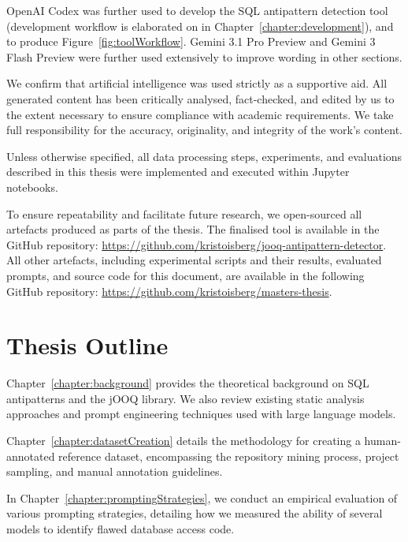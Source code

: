 OpenAI Codex was further used to develop the SQL antipattern detection tool (development workflow is elaborated on in Chapter~\ref{chapter:development}), and to produce Figure~\ref{fig:toolWorkflow}. Gemini 3.1 Pro Preview and Gemini 3 Flash Preview  were further used extensively to improve wording in other sections.

We confirm that artificial intelligence was used strictly as a supportive aid. All generated content has been critically analysed, fact-checked, and edited by us to the extent necessary to ensure compliance with academic requirements. We take full responsibility for the accuracy, originality, and integrity of the work’s content.

Unless otherwise specified, all data processing steps, experiments, and evaluations described in this thesis were implemented and executed within Jupyter  notebooks.

To ensure repeatability and facilitate future research, we open-sourced all artefacts produced as parts of the thesis. The finalised tool is available in the GitHub repository: \href{https://github.com/kristoisberg/jooq-antipattern-detector}{https://github.com/kristoisberg/jooq-antipattern-detector}. All other artefacts, including experimental scripts and their results, evaluated prompts, and source code for this document, are available in the following GitHub repository: \href{https://github.com/kristoisberg/masters-thesis}{https://github.com/kristoisberg/masters-thesis}.

\section{Thesis Outline}\label{sec:outline}

Chapter~\ref{chapter:background} provides the theoretical background on SQL antipatterns and the jOOQ library. We also review existing static analysis approaches and prompt engineering techniques used with large language models.

Chapter~\ref{chapter:datasetCreation} details the methodology for creating a human-annotated reference dataset, encompassing the repository mining process, project sampling, and manual annotation guidelines.

In Chapter~\ref{chapter:promptingStrategies}, we conduct an empirical evaluation of various prompting strategies, detailing how we measured the ability of several models to identify flawed database access code.

